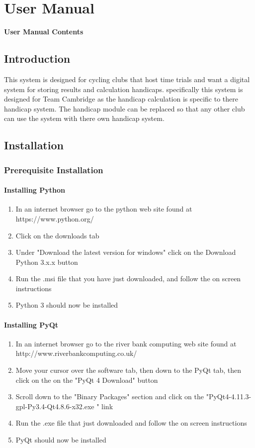 \chapter{User Manual}
\startcontents[UserManual]
\textbf{User Manual Contents}


\section{Introduction}
This system is designed for cycling clubs that host time trials and want a digital system for storing results and calculation handicaps. specifically  this system is designed for Team Cambridge as the handicap calculation is specific to there handicap system. The handicap module can be replaced so that any other club can use the system with there own handicap system.
\section{Installation}

\subsection{Prerequisite Installation}

\subsubsection{Installing Python}
\begin{enumerate}
\item In an internet browser go to the python web site found at https://www.python.org/
\item Click on the downloads tab
\item Under "Download the latest version for windows" click on the Download Python 3.x.x button
\item Run the .msi file that you have just downloaded, and follow the on screen instructions
\item Python 3 should now be installed
\end{enumerate}
\subsubsection{Installing PyQt}
\begin{enumerate}
\item In an internet browser go to the river bank computing web site found at http://www.riverbankcomputing.co.uk/
\item Move your cursor over the software tab, then down to the PyQt tab, then click on the on the "PyQt 4 Download" button
\item Scroll down to the "Binary Packages" section and click on the "PyQt4-4.11.3-gpl-Py3.4-Qt4.8.6-x32.exe	" link
\item Run the .exe file that just downloaded and follow the on screen instructions
\item PyQt should now be installed
\end{enumerate}

